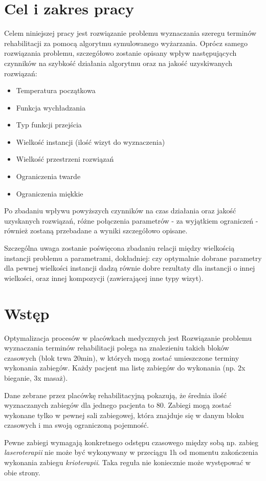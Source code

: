 \chapter{Cel i zakres pracy}
Celem niniejszej pracy jest rozwiązanie problemu wyznaczania szeregu terminów rehabilitacji za pomocą algorytmu symulowanego wyżarzania. Oprócz samego rozwiązania problemu, szczegółowo zostanie opisany wpływ następujących czynników na szybkość działania algorytmu oraz na jakość uzyskiwanych rozwiązań:

\begin{itemize}
\item Temperatura początkowa
\item Funkcja wychładzania
\item Typ funkcji przejścia
\item Wielkość instancji (ilość wizyt do wyznaczenia)
\item Wielkość przestrzeni rozwiązań
\item Ograniczenia twarde
\item Ograniczenia miękkie
\end{itemize}
Po zbadaniu wpływu powyższych czynników na czas działania oraz jakość uzyskanych rozwiązań, różne połączenia parametrów - za wyjątkiem ograniczeń - również zostaną przebadane a wyniki szczegółowo opisane. 

Szczególna uwaga zostanie poświęcona zbadaniu relacji między wielkością instancji problemu a parametrami, dokładniej: czy optymalnie dobrane parametry dla pewnej wielkości instancji dadzą równie dobre rezultaty dla instancji o innej wielkości, oraz innej kompozycji (zawierającej inne typy wizyt).

\chapter{Wstęp}
Optymalizacja procesów w placówkach medycznych jest 
Rozwiązanie problemu wyznaczania terminów rehabilitacji polega na znalezieniu takich bloków
czasowych (blok trwa 20min), w których mogą zostać umieszczone terminy wykonania zabiegów. Każdy
pacjent ma listę zabiegów do wykonania (np. 2x bieganie, 3x masaż). 

Dane zebrane przez placówkę rehabilitacyjną pokazują, że średnia ilość wyznaczanych zabiegów dla jednego pacjenta to 80. Zabiegi mogą zostać wykonane tylko w pewnej sali zabiegowej, która znajduje się w danym bloku czasowych i ma swoją ograniczoną pojemność.

Pewne zabiegi wymagają konkretnego odstępu czasowego między sobą np. zabieg
\emph{laseroterapii} nie może być wykonywany w przeciągu 1h od momentu zakończenia
wykonania zabiegu \emph{krioterapii}. Taka reguła nie koniecznie może występować w obie
strony.

